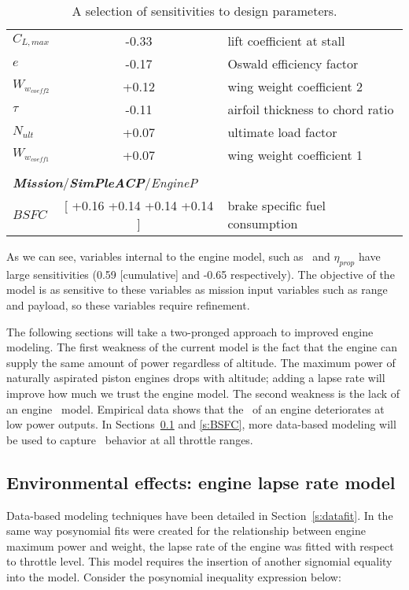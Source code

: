 \begin{table}
\begin{tabular}{l c l}
            $C_{L,max}$ & -0.33 & lift coefficient at stall \\
            $e$ & -0.17 & Oswald efficiency factor \\
            $W_{w_{coeff2}}$ & +0.12 & wing weight coefficient 2 \\
            $\tau$ & -0.11 & airfoil thickness to chord ratio \\
            $N_{ult}$ & +0.07 & ultimate load factor \\
            $W_{w_{coeff1}}$ & +0.07 & wing weight coefficient 1 \\
            & & \\
            \multicolumn{3}{l}{\textit{\textbf{Mission}}/\textit{\textbf{SimPleACP}}/\textit{EngineP}} \\
            $BSFC$ & [ +0.16 +0.14 +0.14 +0.14    ] & brake specific fuel consumption \\
            \bottomrule
        \end{tabular}
        \caption{A selection of sensitivities to design parameters.}
        \label{t:sens}
    \end{table}

As we can see, variables internal to the engine model, such as \BSFC~and $\eta_{prop}$ have
large sensitivities (0.59 [cumulative] and -0.65 respectively). The objective of the model
is as sensitive to these variables as mission input variables such as range and payload, so
these variables require refinement.

The following sections will take a two-pronged approach to improved engine modeling.
The first weakness of the current model is the fact that the engine can supply the same amount of power
regardless of altitude. The maximum power of naturally aspirated piston engines drops
with altitude; adding a lapse rate will improve how much we trust the engine model.
The second weakness is the lack of an engine \BSFC~model. Empirical data shows that the
\BSFC~of an engine deteriorates at low power outputs.
In Sections~\ref{s:lapse} and \ref{s:BSFC}, more data-based modeling will be used
to capture \BSFC~behavior at all throttle ranges.

\subsection{Environmental effects: engine lapse rate model}
\label{s:lapse}

Data-based modeling techniques have been detailed in Section~\ref{s:datafit}.
In the same way posynomial fits were created for the relationship between
engine maximum power and weight, the lapse rate of the engine was fitted with respect to throttle level.
This model requires the insertion of another signomial equality into the model. Consider the
posynomial inequality expression below:

